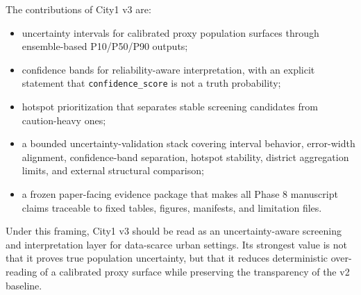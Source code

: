 The contributions of City1 v3 are:

\begin{itemize}
\item uncertainty intervals for calibrated proxy population surfaces through ensemble-based P10/P50/P90 outputs;
\item confidence bands for reliability-aware interpretation, with an explicit statement that \texttt{confidence\_score} is not a truth probability;
\item hotspot prioritization that separates stable screening candidates from caution-heavy ones;
\item a bounded uncertainty-validation stack covering interval behavior, error-width alignment, confidence-band separation, hotspot stability, district aggregation limits, and external structural comparison;
\item a frozen paper-facing evidence package that makes all Phase 8 manuscript claims traceable to fixed tables, figures, manifests, and limitation files.
\end{itemize}

Under this framing, City1 v3 should be read as an uncertainty-aware screening and interpretation layer for data-scarce urban settings. Its strongest value is not that it proves true population uncertainty, but that it reduces deterministic over-reading of a calibrated proxy surface while preserving the transparency of the v2 baseline.

